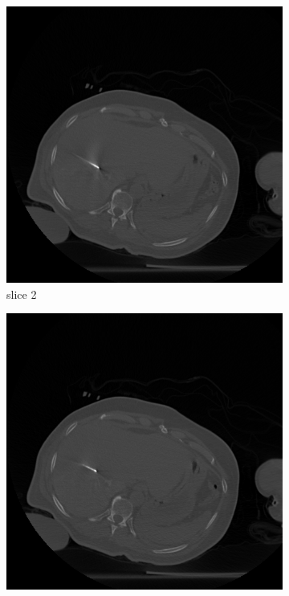 \documentclass[journal]{IEEEtran}
\begin{document}
\begin{figure}[h!]
\begin{subfigure}[b]{0.24\linewidth}
        \includegraphics[width=\textwidth]{../images/tmh/RFA2/template2.png}
 \caption{slice 2}
    \end{subfigure}
     \begin{subfigure}[b]{0.24\linewidth}
        \includegraphics[width=\textwidth]{../images/tmh/RFA2/template3.png}

\end{subfigure}
\end{figure}
\end{document}
